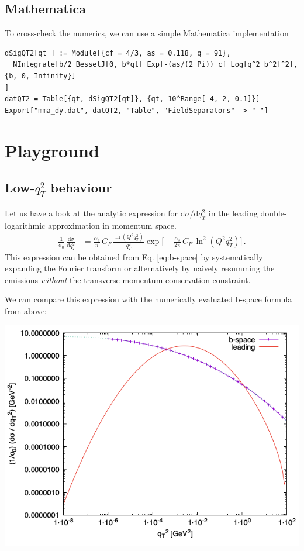 \documentclass[11pt]{article}
\begin{document}
\subsection{Mathematica}
\label{sec:org84853df}
To cross-check the numerics, we can use a simple Mathematica implementation
\begin{verbatim}
dSigQT2[qt_] := Module[{cf = 4/3, as = 0.118, q = 91},
  NIntegrate[b/2 BesselJ[0, b*qt] Exp[-(as/(2 Pi)) cf Log[q^2 b^2]^2], {b, 0, Infinity}]
]
datQT2 = Table[{qt, dSigQT2[qt]}, {qt, 10^Range[-4, 2, 0.1]}]
Export["mma_dy.dat", datQT2, "Table", "FieldSeparators" -> " "]
\end{verbatim}


\section{Playground}
\label{sec:org192f5a7}

\subsection{Low-\(q_T^2\) behaviour}
\label{sec:orgbe0d671}
Let us have a look at the analytic expression for \(\mathrm{d}\sigma/\mathrm{d}q_T^2\) in the leading double-logarithmic approximation in momentum space.
\begin{align}
  \frac{1}{\sigma_0}\,\frac{\mathrm{d}\sigma}{\mathrm{d}q_T^2}
  &=
  \frac{\alpha_s}{\pi}\, C_F \, \frac{\ln(Q^2 q_T^2)}{q_T^2}
  \exp\Big[
    -\frac{\alpha_s}{2\pi}\, C_F \, \ln^2(Q^2 q_T^2)
  \Big]
  \,.
\end{align}
This expression can be obtained from Eq. \eqref{eq:b-space} by systematically expanding the Fourier transform or alternatively by naively resumming the emissions \emph{without} the transverse momentum conservation constraint.

We can compare this expression with the numerically evaluated b-space formula from above:
\begin{center}
\includegraphics[width=.9\linewidth]{plot_QT2.png}
\end{center}
\end{document}
